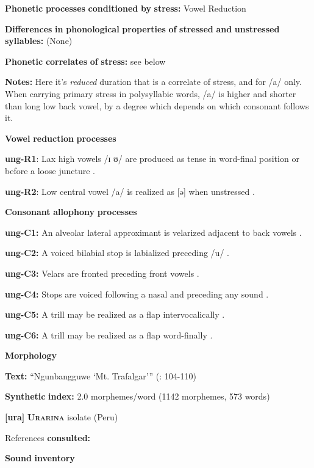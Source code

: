 \begin{styleBody}
\textbf{Phonetic} \textbf{processes} \textbf{conditioned} \textbf{by} \textbf{stress:} Vowel Reduction

\textbf{Differences} \textbf{in} \textbf{phonological} \textbf{properties} \textbf{of} \textbf{stressed} \textbf{and} \textbf{unstressed} \textbf{syllables:} (None)

\textbf{Phonetic} \textbf{correlates} \textbf{of} \textbf{stress:} see below

\textbf{Notes:} Here it’s \textit{reduced} duration that is a correlate of stress, and for /a/ only. When carrying primary stress in polysyllabic words, /a/ is higher and shorter than long low back vowel, by a degree which depends on which consonant follows it.

\textbf{Vowel} \textbf{reduction} \textbf{processes}

\textbf{ung-R1}: Lax high vowels /ɪ ʊ/ are produced as tense in word-final position or before a loose juncture \citep[13-16]{Rumsey1978}.

\textbf{ung-R2}: Low central vowel /a/ is realized as [ə] when unstressed \citep[17-18]{Rumsey1978}.

\textbf{Consonant} \textbf{allophony} \textbf{processes}

\textbf{ung-C1:} An alveolar lateral approximant is velarized adjacent to back vowels \citep[11]{Rumsey1978}.

\textbf{ung-C2:} A voiced bilabial stop is labialized preceding /u/ \citep[9-10]{Rumsey1978}.

\textbf{ung-C3:} Velars are fronted preceding front vowels \citep[11]{Rumsey1978}.

\textbf{ung-C4:} Stops are voiced following a nasal and preceding any sound \citep[9]{Rumsey1978}.

\textbf{ung-C5:} A trill may be realized as a flap intervocalically \citep[12]{Rumsey1978}.

\textbf{ung-C6:} A trill may be realized as a flap word-finally \citep[12]{Rumsey1978}.

\textbf{Morphology}

\textbf{Text:} “Ngunbangguwe ‘Mt. Trafalgar’” (\citealt{CoateOates1970}: 104-110)

\textbf{Synthetic} \textbf{index:} 2.0 morphemes/word (1142 morphemes, 573 words)

\textbf{[ura]}   \textbf{\textsc{Urarina}}  isolate (Peru)

References \textbf{consulted:} \citet{Olawsky2006}

\textbf{Sound} \textbf{inventory}


\end{styleBody}

